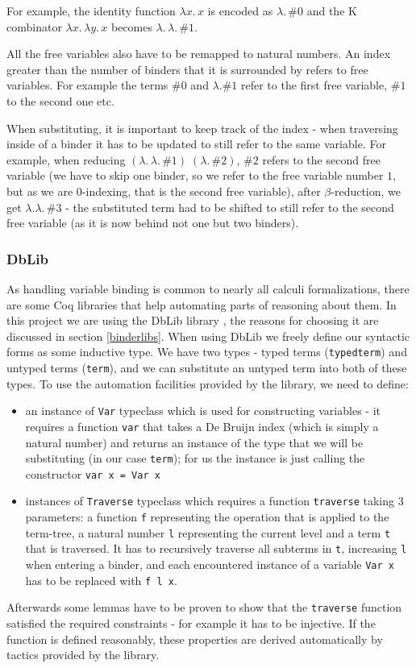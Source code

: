 \documentclass[runningheads]{article}
\begin{document}
For example, the identity function $\lambda x. \, x$ is encoded as $\lambda. \, \#0$ and the K combinator $\lambda x. \, \lambda y. \, x$ becomes $\lambda. \, \lambda. \, \#1$.

All the free variables also have to be remapped to natural numbers. An index greater than the number of binders that it is surrounded by refers to free variables. For example the terms $\#0$ and $\lambda. \#1$ refer to the first free variable, $\#1$ to the second one etc.

When substituting, it is important to keep track of the index - when traversing inside of a binder it has to be updated to still refer to the same variable.
For example, when reducing $(\lambda. \, \lambda. \, \#1) \; (\lambda. \, \#2)$, $\#2$ refers to the second free variable (we have to skip one binder, so we refer to the free variable number $1$, but as we are $0$-indexing, that is the second free variable), after $\beta$-reduction, we get $\lambda. \lambda. \, \#3$ - the substituted term had to be shifted to still refer to the second free variable (as it is now behind not one but two binders).

\subsubsection{DbLib}

As handling variable binding is common to nearly all calculi formalizations, there are some Coq libraries that help automating parts of reasoning about them. In this project we are using the DbLib library \cite{dblib}, the reasons for choosing it are discussed in section \ref{binderlibs}.
\label{traverse}
When using DbLib we freely define our syntactic forms as some inductive type. We have two types - typed terms (\texttt{typedterm}) and untyped terms (\texttt{term}), and we can substitute an untyped term into both of these types. To use the automation facilities provided by the library, we need to define:
\begin{itemize}
  \item an instance of \texttt{Var} typeclass which is used for constructing variables - it requires a function \texttt{var} that takes a De Bruijn index (which is simply a natural number) and returns an instance of the type that we will be substituting (in our case \texttt{term}); for us the instance is just calling the constructor \texttt{var x = Var x}
  \item instances of \texttt{Traverse} typeclass which requires a function \texttt{traverse} taking 3 parameters: a function \texttt{f} representing the operation that is applied to the term-tree, a natural number \texttt{l} representing the current level and a term \texttt{t} that is traversed. It has to recursively traverse all subterms in \texttt{t}, increasing \texttt{l} when entering a binder, and each encountered instance of a variable \texttt{Var x} has to be replaced with \texttt{f l x}.
\end{itemize}
Afterwards some lemmas have to be proven to show that the \texttt{traverse} function satisfied the required constraints - for example it has to be injective. If the function is defined reasonably, these properties are derived automatically by tactics provided by the library.
\end{document}

